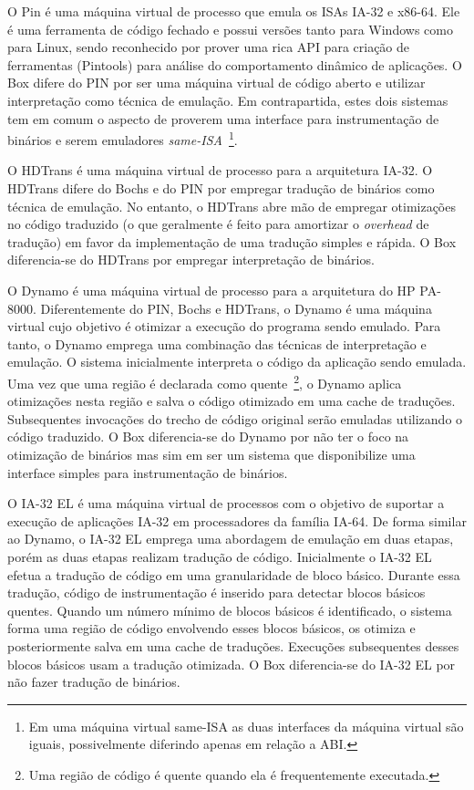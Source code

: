 \documentclass[11pt,twoside]{article}
\begin{document}
O Pin \cite{Luk2005} é uma máquina virtual de processo que emula os ISAs IA-32 e
x86-64. Ele é uma ferramenta de código fechado e possui versões tanto para
Windows como para Linux, sendo reconhecido por prover uma rica API para criação
de ferramentas (Pintools) para análise do comportamento dinâmico de
aplicações. O Box difere do PIN por ser uma máquina virtual de código aberto e
utilizar interpretação como técnica de emulação. Em contrapartida, estes dois
sistemas tem em comum o aspecto de proverem uma interface para instrumentação de
binários e serem emuladores \emph{same-ISA}~\footnote{Em uma máquina virtual
same-ISA as duas interfaces da máquina virtual são iguais, possivelmente
diferindo apenas em relação a ABI.}.

O HDTrans \cite{Sridhar2006} é uma máquina virtual de processo para a
arquitetura IA-32. O HDTrans difere do Bochs e do PIN por empregar tradução de
binários como técnica de emulação. No entanto, o HDTrans abre mão de empregar
otimizações no código traduzido (o que geralmente é feito para amortizar o
\emph{overhead} de tradução) em favor da implementação de uma tradução simples
e rápida. O Box diferencia-se do HDTrans por empregar interpretação de binários.

O Dynamo \cite{Bala2000} é uma máquina virtual de processo para a arquitetura do
HP PA-8000. Diferentemente do PIN, Bochs e HDTrans, o Dynamo é uma máquina
virtual cujo objetivo é otimizar a execução do programa sendo emulado. Para
tanto, o Dynamo emprega uma combinação das técnicas de interpretação e
emulação. O sistema inicialmente interpreta o código da aplicação sendo
emulada. Uma vez que uma região é declarada como quente~\footnote{Uma região de
  código é quente quando ela é frequentemente executada.}, o Dynamo aplica
otimizações nesta região e salva o código otimizado em uma cache de
traduções. Subsequentes invocações do trecho de código original serão emuladas
utilizando o código traduzido. O Box diferencia-se do Dynamo por não ter o foco
na otimização de binários mas sim em ser um sistema que disponibilize uma
interface simples para instrumentação de binários.

O IA-32 EL \cite{Baraz2003} é uma máquina virtual de processos com o objetivo de
suportar a execução de aplicações IA-32 em processadores da família IA-64. De
forma similar ao Dynamo, o IA-32 EL emprega uma abordagem de emulação em duas
etapas, porém as duas etapas realizam tradução de código. Inicialmente o IA-32
EL efetua a tradução de código em uma granularidade de bloco básico. Durante
essa tradução, código de instrumentação é inserido para detectar blocos básicos
quentes. Quando um número mínimo de blocos básicos é identificado, o sistema
forma uma região de código envolvendo esses blocos básicos, os otimiza e
posteriormente salva em uma cache de traduções. Execuções subsequentes desses
blocos básicos usam a tradução otimizada.  O Box diferencia-se do IA-32 EL por
não fazer tradução de binários.
\end{document}
